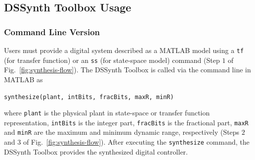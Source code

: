 \documentclass[10pt,conference]{IEEEtran}
\newcommand\tool{{DSSynth Toolbox}\xspace}
\begin{document}
%
%
%
%
%

\subsection{\tool Usage}

\subsubsection{Command Line Version}

Users must provide a digital system described as a MATLAB model using a
\texttt{tf} (for transfer function) or an \texttt{ss} (for state-space
model) command (Step $1$ of Fig.~\ref{fig:synthesis-flow}).  The \tool is
called via the command line in MATLAB as

\begin{center} 
\texttt{synthesize(plant, intBits, fracBits, maxR, minR)}
\end{center} 

\noindent where \texttt{plant} is the physical plant in state-space or
transfer function representation, \texttt{intBits} is the integer part,
\texttt{fracBits} is the fractional part, \texttt{maxR} and \texttt{minR}
are the maximum and minimum dynamic range, respectively (Steps $2$ and
$3$ of Fig.~\ref{fig:synthesis-flow}).
%
After executing the \texttt{synthesize} command, the \tool provides the
synthesized digital controller.

\end{document}
